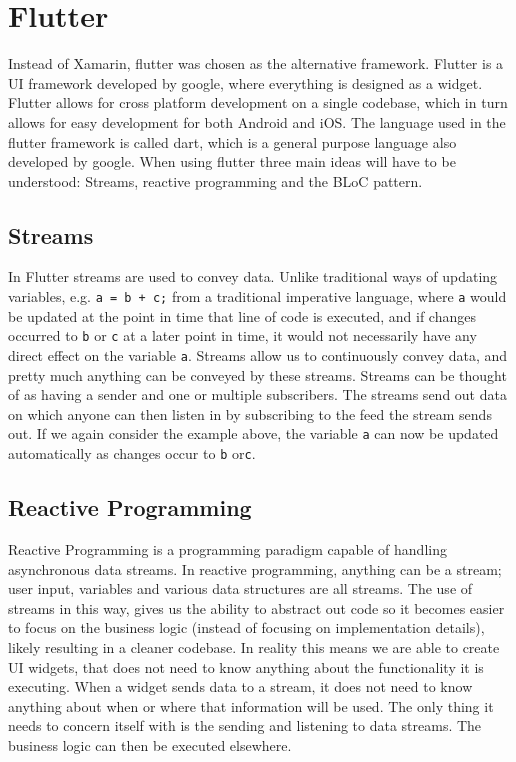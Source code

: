 \section{Flutter}
Instead of Xamarin, flutter was chosen as the alternative framework.
Flutter is a UI framework developed by google, where everything is designed as a widget.
Flutter allows for cross platform development on a single codebase, which in turn allows for easy development for both Android and iOS.
The language used in the flutter framework is called dart, which is a general purpose language also developed by google.
When using flutter three main ideas will have to be understood:
Streams, reactive programming and the BLoC pattern.

\subsection{Streams}
In Flutter streams are used to convey data.
Unlike traditional ways of updating variables, e.g. \lstinline{a = b + c;} from a traditional imperative language, where \lstinline{a} would be updated at the point in time that line of code is executed, and if changes occurred to \lstinline{b} or \lstinline{c} at a later point in time, it would not necessarily have any direct effect on the variable \lstinline{a}.
Streams allow us to continuously convey data, and pretty much anything can be conveyed by these streams.
Streams can be thought of as having a sender and one or multiple subscribers.
The streams send out data on which anyone can then listen in by subscribing to the feed the stream sends out.
If we again consider the example above, the variable \lstinline{a} can now be updated automatically as changes occur to \lstinline{b} or\lstinline{c}.
\subsection{Reactive Programming}
Reactive Programming is a programming paradigm capable of handling asynchronous data streams. 
In reactive programming, anything can be a stream; user input, variables and various data structures are all streams. The use of streams in this way, gives us the ability to abstract out code so it becomes easier to focus on the business logic (instead of focusing on implementation details), likely resulting in a cleaner codebase.
In reality this means we are able to create UI widgets, that does not need to know anything about the functionality it is executing. 
When a widget sends data to a stream, it does not need to know anything about when or where that information will be used. The only thing it needs to concern itself with is the sending and listening to data streams. The business logic can then be executed elsewhere. 
